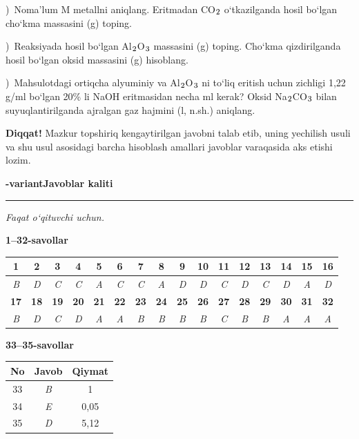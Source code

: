 \documentclass[11pt,a4paper]{article}
\renewcommand{\textsubscript}[1]{\ensuremath{_{\text{\fontsize{8}{8}\selectfont #1}}}}
\newcommand{\qsep}{\par\vspace{13pt}}
\newcommand{\diqqat}[1]{\par\smallskip\noindent\textbf{Diqqat!} #1\par\medskip}
\begin{document}
)\ Noma'lum M metallni aniqlang. Eritmadan CO\textsubscript{2} o`tkazilganda hosil bo`lgan cho`kma massasini (g) toping.\par
{})\ Reaksiyada hosil bo`lgan Al\textsubscript{2}O\textsubscript{3} massasini (g) toping. Cho`kma qizdirilganda hosil bo`lgan oksid massasini (g) hisoblang.\par
{})\ Mahsulotdagi ortiqcha alyuminiy va Al\textsubscript{2}O\textsubscript{3} ni to`liq eritish uchun zichligi 1,22 g/ml bo`lgan 20\% li NaOH eritmasidan necha ml kerak? Oksid Na\textsubscript{2}CO\textsubscript{3} bilan suyuqlantirilganda ajralgan gaz hajmini (l, n.sh.) aniqlang.\par
\diqqat{Mazkur topshiriq kengaytirilgan javobni talab etib, uning yechilish usuli va shu usul asosidagi barcha hisoblash amallari javoblar varaqasida aks etishi lozim.}\qsep
\newpage
\noindent\textbf{\fontsize{13}{15}-variant}\hfill \textbf{Javoblar kaliti}\par\smallskip\hrule\smallskip
\textit{Faqat o`qituvchi uchun.}\par\medskip
\noindent\textbf{1--32-savollar}\par\smallskip
\noindent\begin{tabular}{|c|c|c|c|c|c|c|c|c|c|c|c|c|c|c|c|}\hline
\textbf{1} & \textbf{2} & \textbf{3} & \textbf{4} & \textbf{5} & \textbf{6} & \textbf{7} & \textbf{8} & \textbf{9} & \textbf{10} & \textbf{11} & \textbf{12} & \textbf{13} & \textbf{14} & \textbf{15} & \textbf{16}\\\hline
\textsl{B} & \textsl{D} & \textsl{C} & \textsl{C} & \textsl{A} & \textsl{C} & \textsl{C} & \textsl{A} & \textsl{D} & \textsl{D} & \textsl{C} & \textsl{D} & \textsl{C} & \textsl{D} & \textsl{A} & \textsl{D}\\\hline
\textbf{17} & \textbf{18} & \textbf{19} & \textbf{20} & \textbf{21} & \textbf{22} & \textbf{23} & \textbf{24} & \textbf{25} & \textbf{26} & \textbf{27} & \textbf{28} & \textbf{29} & \textbf{30} & \textbf{31} & \textbf{32}\\\hline
\textsl{B} & \textsl{D} & \textsl{C} & \textsl{D} & \textsl{A} & \textsl{A} & \textsl{B} & \textsl{B} & \textsl{B} & \textsl{B} & \textsl{C} & \textsl{B} & \textsl{B} & \textsl{A} & \textsl{A} & \textsl{A}\\\hline
\end{tabular}\par\medskip
\noindent\textbf{33--35-savollar}\par\smallskip
\noindent\begin{tabular}{|c|c|c|}\hline \textbf{No} & \textbf{Javob} & \textbf{Qiymat}\\\hline
33 & \textsl{B} & 1\\\hline
34 & \textsl{E} & 0,05\\\hline
35 & \textsl{D} & 5,12\\\hline
\end{tabular}\par\medskip
\end{document}
